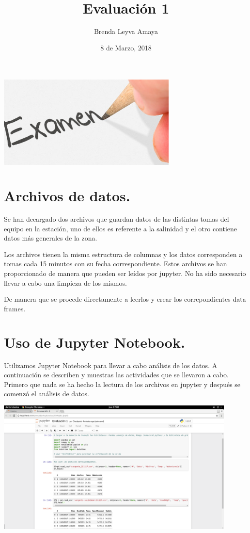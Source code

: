 \documentclass{article} %
\title{Evaluación 1}
\author{Brenda Leyva Amaya}
\date{8 de Marzo, 2018}
\begin{document}
\maketitle %

 \begin{center}
 	\includegraphics[width=9cm]{examen.jpg}
 \end{center}

\section{Archivos de datos.}

Se han decargado dos archivos que guardan datos de las distintas tomas del equipo en la estación, uno de ellos es referente a la salinidad y el otro contiene datos más generales de la zona. 

\vspace{0.5 cm}

Los archivos tienen la misma estructura de columnas y los datos corresponden a tomas cada 15 minutos con su fecha correspondiente. Estos archivos se han proporcionado de manera que pueden ser leídos por jupyter. No ha sido necesario llevar a cabo una limpieza de los mismos. 

\vspace{0.5 cm}

De manera que se procede directamente a leerlos y crear los correpondientes data frames.


\section{Uso de Jupyter Notebook.}

Utilizamos Jupyter Notebook para llevar a cabo análisis de los datos. A continuación se describen y muestras las actividades que se llevaron a cabo. Primero que nada se ha hecho la lectura de los archivos en jupyter y después se comenzó el análisis de datos. 

 \begin{center}
 	\includegraphics[width=12cm]{lectura.png}
 \end{center}
\end{document}
